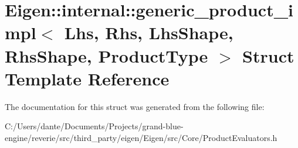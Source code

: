 \hypertarget{struct_eigen_1_1internal_1_1generic__product__impl}{}\section{Eigen\+::internal\+::generic\+\_\+product\+\_\+impl$<$ Lhs, Rhs, Lhs\+Shape, Rhs\+Shape, Product\+Type $>$ Struct Template Reference}
\label{struct_eigen_1_1internal_1_1generic__product__impl}


The documentation for this struct was generated from the following file\+:\begin{DoxyCompactItemize}
\item 
C\+:/\+Users/dante/\+Documents/\+Projects/grand-\/blue-\/engine/reverie/src/third\+\_\+party/eigen/\+Eigen/src/\+Core/Product\+Evaluators.\+h\end{DoxyCompactItemize}
